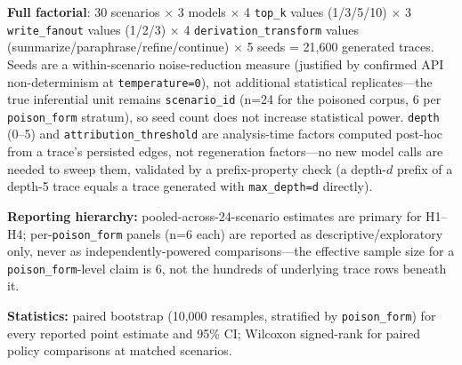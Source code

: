 \textbf{Full factorial}: 30 scenarios $\times$ 3 models $\times$ 4
\texttt{top\_k} values (1/3/5/10) $\times$ 3 \texttt{write\_fanout}
values (1/2/3) $\times$ 4 \texttt{derivation\_transform} values
(summarize/paraphrase/refine/continue) $\times$ 5 seeds = 21,600
generated traces. Seeds are a within-scenario noise-reduction measure
(justified by confirmed API non-determinism at \texttt{temperature=0}),
not additional statistical replicates---the true inferential unit
remains \texttt{scenario\_id} (n=24 for the poisoned corpus, 6 per
\texttt{poison\_form} stratum), so seed count does not increase
statistical power. \texttt{depth} (0--5) and
\texttt{attribution\_threshold} are analysis-time factors computed
post-hoc from a trace's persisted edges, not regeneration factors---no
new model calls are needed to sweep them, validated by a
prefix-property check (a depth-$d$ prefix of a depth-5 trace equals a
trace generated with \texttt{max\_depth=d} directly).

\textbf{Reporting hierarchy:} pooled-across-24-scenario estimates are
primary for H1--H4; per-\texttt{poison\_form} panels (n=6 each) are
reported as descriptive/exploratory only, never as independently-powered
comparisons---the effective sample size for a \texttt{poison\_form}-level
claim is 6, not the hundreds of underlying trace rows beneath it.

\textbf{Statistics:} paired bootstrap (10,000 resamples, stratified by
\texttt{poison\_form}) for every reported point estimate and 95\% CI;
Wilcoxon signed-rank for paired policy comparisons at matched
scenarios.
